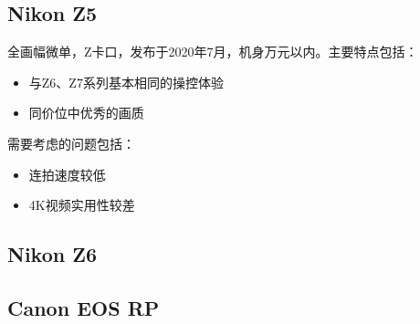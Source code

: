 \documentclass{ctexart}
\begin{document}
\subsection{Nikon Z5}
全画幅微单，Z卡口，发布于2020年7月，机身万元以内。主要特点包括：
\begin{itemize}
    \item 与Z6、Z7系列基本相同的操控体验
    \item 同价位中优秀的画质
\end{itemize}
需要考虑的问题包括：
\begin{itemize}
    \item 连拍速度较低
    \item 4K视频实用性较差
\end{itemize}
\subsection{Nikon Z6}
\subsection{Canon EOS RP}


\end{document}
